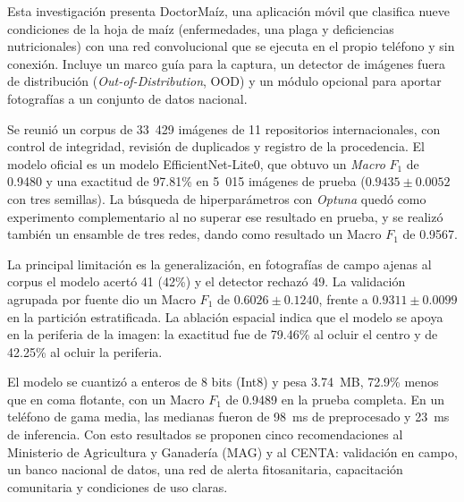 \documentclass[12pt,letterpaper]{report}
\begin{document}
Esta investigaci\'on presenta DoctorMa\'iz, una aplicaci\'on m\'ovil que clasifica nueve condiciones de la hoja de ma\'iz (enfermedades, una plaga y deficiencias nutricionales) con una red convolucional que se ejecuta en el propio tel\'efono y sin conexi\'on. Incluye un marco gu\'ia para la captura, un detector de im\'agenes fuera de distribuci\'on (\textit{Out-of-Distribution}, OOD) y un m\'odulo opcional para aportar fotograf\'ias a un conjunto de datos nacional.

Se reuni\'o un corpus de 33~429 im\'agenes de 11 repositorios internacionales, con control de integridad, revisi\'on de duplicados y registro de la procedencia. El modelo oficial es un modelo EfficientNet-Lite0, que obtuvo un \textit{Macro} $F_1$ de 0.9480 y una exactitud de 97.81\% en 5~015 im\'agenes de prueba ($0.9435 \pm 0.0052$ con tres semillas). La b\'usqueda de hiperpar\'ametros con \textit{Optuna} qued\'o como experimento complementario al no superar ese resultado en prueba, y se realizó también un ensamble de tres redes, dando como resultado un Macro $F_1$ de 0.9567.

La principal limitaci\'on es la generalizaci\'on, en fotograf\'ias de campo ajenas al corpus el modelo acert\'o 41 (42\%) y el detector rechaz\'o 49. La validaci\'on agrupada por fuente dio un Macro $F_1$ de $0.6026 \pm 0.1240$, frente a $0.9311 \pm 0.0099$ en la partici\'on estratificada. La ablaci\'on espacial indica que el modelo se apoya en la periferia de la imagen: la exactitud fue de 79.46\% al ocluir el centro y de 42.25\% al ocluir la periferia.

El modelo se cuantiz\'o a enteros de 8 bits (Int8) y pesa 3.74~MB, 72.9\% menos que en coma flotante, con un Macro $F_1$ de 0.9489 en la prueba completa. En un teléfono de gama media, las medianas fueron de 98~ms de preprocesado y 23~ms de inferencia. Con esto resultados se proponen cinco recomendaciones al Ministerio de Agricultura y Ganader\'ia (MAG) y al CENTA: validaci\'on en campo, un banco nacional de datos, una red de alerta fitosanitaria, capacitaci\'on comunitaria y condiciones de uso claras.

\newpage
\tableofcontents
\newpage
\listoftables
\newpage
\listoffigures

\newpage
\onehalfspacing
{}
\setcounter{page}{1}






\end{document}
